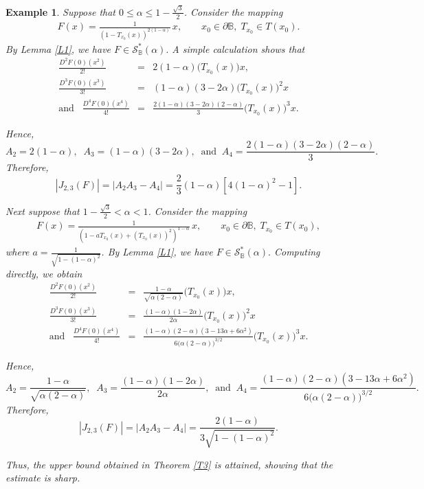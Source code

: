 \documentclass[11pt, reqno]{amsart}
\newtheorem{exm}{Example}[section]
\numberwithin{equation}{section}
\newcommand{\beas}{\begin{eqnarray*}}
\newcommand{\eeas}{\end{eqnarray*}}
\newcommand{\bea}{\begin{eqnarray}}
\newcommand{\eea}{\end{eqnarray}}
\begin{document}
\begin{exm} Suppose that $0\leq \alpha\leq  1-\frac{\sqrt 3}{2}$.
Consider the mapping
\bea\label{ex3}
F(x)=
\frac{1}{\left(1-T_{x_0}(x)\right)^{2(1-\alpha)}}\,x,
\qquad
x_0\in\partial\mathbb{B},\;
T_{x_0}\in T(x_0).
\eea
By Lemma \ref{L1}, we have $F\in\mathcal{S}^*_\mathbb{B}(\alpha).$
A simple calculation shows that
\beas
\frac{D^2F(0)(x^2)}{2!}&=&2(1-\alpha)\bigl(T_{x_0}(x)\bigr)x,\\
\frac{D^3F(0)(x^3)}{3!}
&=&(1-\alpha)(3-2\alpha)
\bigl(T_{x_0}(x)\bigr)^2x\\
\text{and}\;\;\;
\frac{D^4F(0)(x^4)}{4!}&=&\frac{2(1-\alpha)(3-2\alpha)(2-\alpha)}{3}
\bigl(T_{x_0}(x)\bigr)^3x.
\eeas

Hence,
\[
A_2=2(1-\alpha),\;\;
A_3=(1-\alpha)(3-2\alpha),\;\;\text{and}\;\;
A_4=\frac{2(1-\alpha)(3-2\alpha)(2-\alpha)}{3}.
\]
Therefore,
\[
|J_{2,3}(F)|
=
\left|A_2A_3-A_4\right|
=\frac{2}{3}(1-\alpha)[4(1-\alpha)^2-1].
\]

Next suppose that $ 1-\frac{\sqrt 3}{2}<\alpha<1$.
Consider the mapping
\bea\label{ex3}
F(x)=
\frac{1}{\left(1-aT_{x_0}(x)+(T_{x_0}(x))^2 \right)^{1-\alpha}}\,x,
\qquad
x_0\in\partial\mathbb{B},\;
T_{x_0}\in T(x_0),
\eea
where $a=\frac{1}{\sqrt{1-(1-\alpha)^2}}$.
By Lemma \ref{L1}, we have $F\in\mathcal{S}^*_\mathbb{B}(\alpha).$
Computing directly, we obtain
\beas
\frac{D^2F(0)(x^2)}{2!}&=&\frac{1-\alpha}{\sqrt{\alpha(2-\alpha)}}\bigl(T_{x_0}(x)\bigr)x,\\
\frac{D^3F(0)(x^3)}{3!}
&=&\frac{(1-\alpha)(1-2\alpha)}{2\alpha}
\bigl(T_{x_0}(x)\bigr)^2x\\
\text{and}\;\;\;
\frac{D^4F(0)(x^4)}{4!}&=&\frac{(1-\alpha)(2-\alpha)(3-13\alpha+6\alpha^2)}{6\bigl(\alpha(2-\alpha)\bigr)^{3/2}}\bigl(T_{x_0}(x)\bigr)^3x.
\eeas

Hence,
\[
A_2=\frac{1-\alpha}{\sqrt{\alpha(2-\alpha)}},\;\;
A_3=\frac{(1-\alpha)(1-2\alpha)}{2\alpha},\;\;\text{and}\;\;
A_4=\frac{(1-\alpha)(2-\alpha)(3-13\alpha+6\alpha^2)}{6\bigl(\alpha(2-\alpha)\bigr)^{3/2}}.
\]
Therefore,
\[
|J_{2,3}(F)|
=
\left|A_2A_3-A_4\right|
=\frac{2(1-\alpha)}{3\sqrt{1-(1-\alpha)^2}}.
\]


Thus, the upper bound obtained in Theorem \ref{T3} is attained, showing that the estimate is sharp.
\end{exm}
\end{document}
